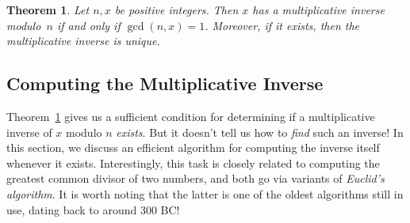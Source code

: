 \documentclass[11pt]{article}
\newcounter{thm}
\newtheorem{theorem}{Theorem}[thm]
\renewcommand{\pmod}[1]{~(\text{mod}~#1)}
\begin{document}
\begin{theorem}\label{thm:inverse}
Let $n,x$ be positive integers. Then $x$ has a multiplicative inverse modulo~$n$ if and only if $\gcd(n,x) = 1$. Moreover, if it exists, then the multiplicative inverse is unique.
\end{theorem}

%
%



\subsection{Computing the Multiplicative Inverse}\label{sscn:computeinverse}

Theorem~\ref{thm:inverse} gives us a sufficient condition for determining if a multiplicative inverse of $x$ modulo $n$ \emph{exists}. But it doesn't tell us how to \emph{find} such an inverse! In this section, we discuss an efficient algorithm for computing the inverse itself whenever it exists. Interestingly, this task is closely related to computing the greatest common divisor of two numbers, and both go via variants of \emph{Euclid's algorithm}. It is worth noting that the latter is one of the oldest algorithms still in use, dating back to around 300 BC!
\end{document}
